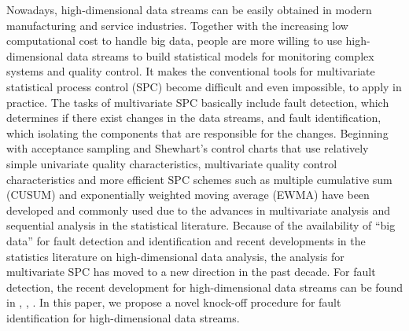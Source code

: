 \documentclass[]{interact}
\theoremstyle{plain}%
\theoremstyle{definition}
\theoremstyle{remark}
\begin{document}
Nowadays, high-dimensional data streams can be easily obtained in modern manufacturing and service industries. Together with the increasing low computational cost to handle big data, people are more willing to use high-dimensional data streams to build statistical models for monitoring complex systems and quality control. It makes the conventional tools for multivariate statistical process control (SPC) become difficult and even impossible, to apply in practice. The tasks of multivariate SPC basically include fault detection, which determines if there exist changes in the data streams, and fault identification, which isolating the components that are responsible for the changes. Beginning with acceptance sampling and Shewhart’s control charts that use relatively simple univariate quality characteristics, multivariate quality control characteristics and more efficient SPC schemes such as multiple cumulative sum (CUSUM) and exponentially weighted moving average (EWMA) have been developed and commonly used due to the advances in multivariate analysis and sequential analysis in the statistical literature. Because of the availability of “big data” for fault detection and identification and recent developments in the statistics literature on high-dimensional data analysis, the analysis for multivariate SPC has moved to a new direction in the past decade. For fault detection, the recent development for high-dimensional data streams can be found in \cite{woodall2014some}, \cite{zou2015efficient}, \cite{xian2018nonparametric}. In this paper, we propose a novel knock-off procedure for fault identification for high-dimensional data streams.
\end{document}
